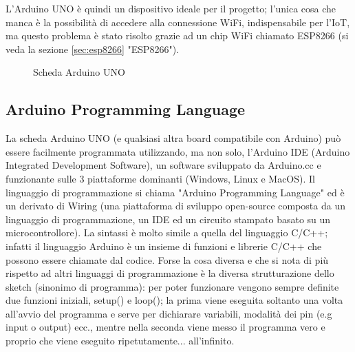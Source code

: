 \documentclass[12pt]{report}
\begin{document}
L'Arduino UNO è quindi un dispositivo ideale per il progetto; l'unica cosa che manca è la possibilità di accedere alla connessione WiFi, indispensabile per l'IoT, ma questo problema è stato risolto grazie ad un chip WiFi chiamato ESP8266 (si veda la sezione \ref{sec:esp8266} "ESP8266").

\begin{figure}
	\caption{Scheda Arduino UNO}
	\label{fig:uno}
\end{figure}

%
\subsection{Arduino Programming Language}
%

La scheda Arduino UNO (e qualsiasi altra board compatibile con Arduino) può essere facilmente programmata utilizzando, ma non solo, l'Arduino IDE (Arduino Integrated Development Software), un software sviluppato da Arduino.cc e funzionante sulle 3 piattaforme dominanti (Windows, Linux e MacOS). Il linguaggio di programmazione si chiama "Arduino Programming Language"\cite{sistemi_embedded_atrent} ed è un derivato di Wiring (una piattaforma di sviluppo open-source composta da un linguaggio di programmazione, un IDE ed un circuito stampato basato su un microcontrollore). La sintassi è molto simile a quella del linguaggio C/C++; infatti il linguaggio Arduino è un insieme di funzioni e librerie C/C++ che possono essere chiamate dal codice. Forse la cosa diversa e che si nota di più rispetto ad altri linguaggi di programmazione è la diversa strutturazione dello sketch (sinonimo di programma): per poter funzionare vengono sempre definite due funzioni iniziali, setup() e loop(); la prima viene eseguita soltanto una volta all'avvio del programma e serve per dichiarare variabili, modalità dei pin (e.g input o output) ecc., mentre nella seconda viene messo il programma vero e proprio che viene eseguito ripetutamente... all'infinito.
\end{document}

